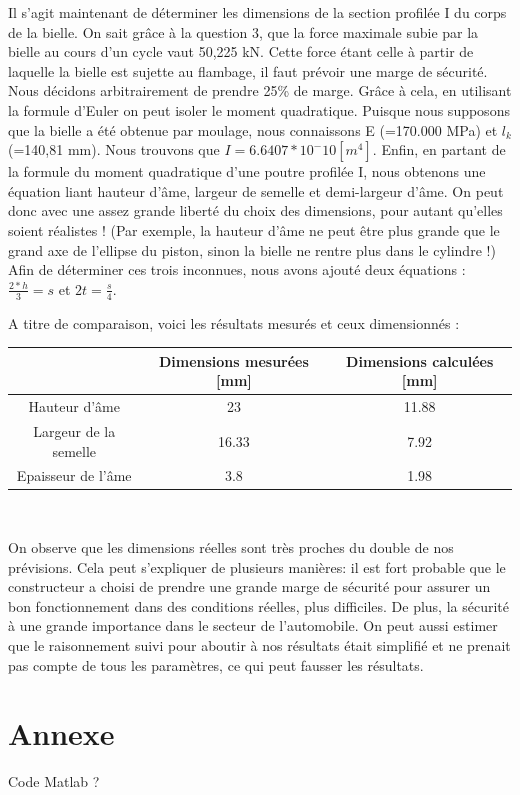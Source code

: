 \documentclass[a4paper,oneside,12pt]{report}
\begin{document}
Il s'agit maintenant de déterminer les dimensions de la section profilée I du corps de la bielle. On sait grâce à la question 3, que la force maximale subie par la bielle au cours d'un cycle vaut 50,225 kN. Cette force étant celle à partir de laquelle la bielle est sujette au flambage, il faut prévoir une marge de sécurité. Nous décidons arbitrairement de prendre 25\% de marge. Grâce à cela, en utilisant la formule d'Euler on peut isoler le moment quadratique. Puisque nous supposons que la bielle a été obtenue par moulage, nous connaissons E (=170.000 MPa) et $l_k$ (=140,81 mm). Nous trouvons que $I = 6.6407*10^-10 [m^4]$. Enfin, en partant de la formule du moment quadratique d'une poutre profilée I, nous obtenons une équation liant hauteur d'âme, largeur de semelle et demi-largeur d'âme. On peut donc avec une assez grande liberté du choix des dimensions, pour autant qu'elles soient réalistes ! (Par exemple, la hauteur d'âme ne peut être plus grande que le grand axe de l'ellipse du piston, sinon la bielle ne rentre plus dans le cylindre !)
Afin de déterminer ces trois inconnues, nous avons ajouté deux équations : $\frac{2*h}{3} = s$ et $2t=\frac{s}{4}$.

A titre de comparaison, voici les résultats mesurés et ceux dimensionnés : 
\begin{center}
\begin{tabular}{|c||c|c|}
\hline 
\ & Dimensions mesurées [mm]  & Dimensions calculées [mm] \\ 
\hline 
Hauteur d'âme & 23 & 11.88 \\ 
\hline 
Largeur de la semelle & 16.33 & 7.92 \\ 
\hline 
Epaisseur de l'âme & 3.8 & 1.98 \\
\hline
\end{tabular} \\
\end{center}

On observe que les dimensions réelles sont très proches du double de nos prévisions. Cela peut s'expliquer de plusieurs manières: il est fort probable que le constructeur a choisi de prendre une grande marge de sécurité pour assurer un bon fonctionnement dans des conditions réelles, plus difficiles. De plus, la sécurité à une grande importance dans le secteur de l'automobile. On peut aussi estimer que le raisonnement suivi pour aboutir à nos résultats était simplifié et ne prenait pas compte de tous les paramètres, ce qui peut fausser les résultats.

\chapter{Annexe}

Code Matlab ?
\end{document}
